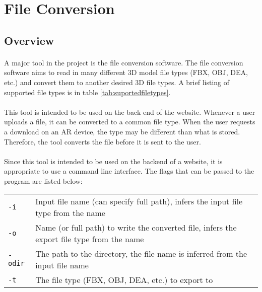 
 \section{File Conversion}

    \subsection{Overview}
    \paragraph{}
    A major tool in the project is the file conversion software.  
    The file conversion software aims to read in many different 3D model file types (FBX, OBJ, DEA, etc.) and convert them to another desired 3D file types.  
    A brief listing of supported file types is in table \ref{tab:suportedfiletypes}.
    
    \paragraph{}
    This tool is intended to be used on the back end of the website.  Whenever a user uploads a file, it can be converted to a common file type.
    When the user requests a download on an AR device, the type may be different than what is stored. Therefore, the tool converts the file before
    it is sent to the user.
    
    \paragraph{}
    Since this tool is intended to be used on the backend of a website, it is appropriate to use a command line interface.  
    The flags that can be passed to the program are listed below:
    
    \begin{table}[h]
        \centering
        \begin{tabular}{l  l}
            \texttt{-i} & Input file name (can specify full path), infers the input file type from the name \\
            \texttt{-o} & Name (or full path) to write the converted file, infers the export file type from the name \\
            \texttt{-odir} & The path to the directory, the file name is inferred from the input file name \\
            \texttt{-t} & The file type (FBX, OBJ, DEA, etc.) to export to
        \end{tabular}
    \end{table}
    
